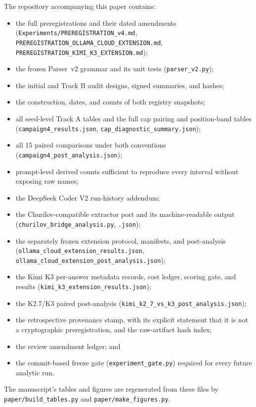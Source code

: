 \documentclass[10pt,twocolumn,letterpaper]{article}
\begin{document}
The repository accompanying this paper contains:
\begin{itemize}
\item the full preregistrations and their dated amendments
  (\texttt{Experiments/PREREGISTRATION\_v4.md}, \texttt{PREREGISTRATION\_OLLAMA\_CLOUD\_EXTENSION.md},
  \texttt{PREREGISTRATION\_KIMI\_K3\_EXTENSION.md});
\item the frozen Parser~v2 grammar and its unit tests (\texttt{parser\_v2.py});
\item the initial and Track B audit designs, signed summaries, and hashes;
\item the construction, dates, and counts of both registry snapshots;
\item all seed-level Track A tables and the full cap pairing and position-band tables
  (\texttt{campaign4\_results.json}, \texttt{cap\_diagnostic\_summary.json});
\item all 15 paired comparisons under both conventions (\texttt{campaign4\_post\_analysis.json});
\item prompt-level derived counts sufficient to reproduce every interval without exposing raw names;
\item the DeepSeek Coder V2 run-history addendum;
\item the Churilov-compatible extractor port and its machine-readable output
  (\texttt{churilov\_bridge\_analysis.py}, \texttt{.json});
\item the separately frozen extension protocol, manifests, and post-analysis
  (\texttt{ollama\_cloud\_extension\_results.json}, \texttt{ollama\_cloud\_extension\_post\_analysis.json});
\item the Kimi K3 per-answer metadata records, cost ledger, scoring gate, and results
  (\texttt{kimi\_k3\_extension\_results.json});
\item the K2.7/K3 paired post-analysis (\texttt{kimi\_k2\_7\_vs\_k3\_post\_analysis.json});
\item the retrospective provenance stamp, with its explicit statement that it is not a
  cryptographic preregistration, and the raw-artifact hash index;
\item the review amendment ledger; and
\item the commit-based freeze gate (\texttt{experiment\_gate.py}) required for every future analytic
  run.
\end{itemize}
The manuscript's tables and figures are regenerated from these files by
\texttt{paper/build\_tables.py} and \texttt{paper/make\_figures.py}.
\end{document}
